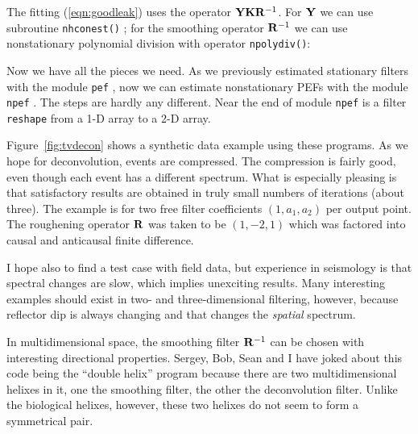 \par
The fitting (\ref{eqn:goodleak}) uses the operator $\bold Y\bold K\bold R^{-1}$.
For $\bold Y$ we can use subroutine
\texttt{nhconest()} ;
for the smoothing operator $\bold R^{-1}$ we can use nonstationary
polynomial division
with operator \texttt{npolydiv()}:

Now we have all the pieces we need.
As we previously estimated stationary filters with
the module \texttt{pef} ,
now we can estimate nonstationary PEFs with
the module \texttt{npef} .
The steps are hardly any different.
Near the end
of module \texttt{npef}
is a filter \texttt{reshape}
from a 1-D array to a 2-D array.
\begin{comment}
If you find it troublesome that
\texttt{nhconest} \vpageref{lst:nhconest}
was using the filter
during the optimization as already multidimensional,
perhaps again,
it is time to examine the Fortran code.
The answer is that there has been a conversion
back and forth partially hidden by Loptran.
\end{comment}


\par
Figure~\ref{fig:tvdecon} shows a synthetic data example using these programs.
As we hope for deconvolution, events are compressed.
The compression is fairly good, even though each event has
a different spectrum.
What is especially pleasing is that satisfactory results
are obtained in truly small numbers of iterations (about three).
The example is for two free filter coefficients $(1,a_1,a_2)$
per output point.
The roughening operator $\bold R$ was taken to be $(1,-2,1)$
which was factored into
causal and anticausal finite difference.
\par
I hope also to find a test case with field data,
but experience in seismology
is that spectral changes are slow,
which implies unexciting results.
Many interesting examples should exist
in two- and three-dimensional filtering, however,
because reflector dip is always changing
and that changes the {\it spatial} spectrum.
\par
In multidimensional space, the smoothing filter $\bold R^{-1}$
can be chosen with interesting directional properties.
Sergey, Bob, Sean and I have joked about this code being
the ``double helix'' program because there are two multidimensional
helixes in it, one the smoothing filter, the other the deconvolution filter.
Unlike the biological helixes, however, these two helixes
do not seem to form a symmetrical pair.

